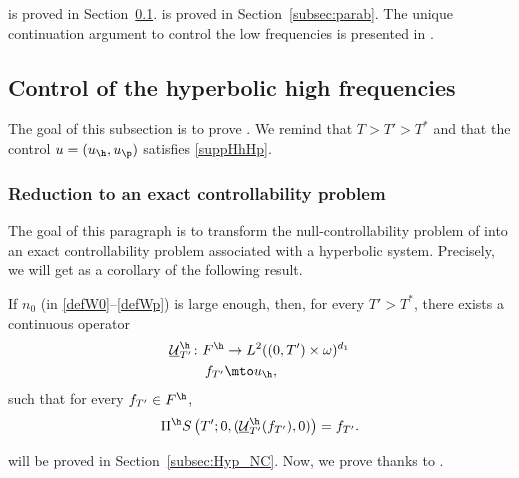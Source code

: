  is proved in Section~\ref{subsec:hyp}.
 is proved in Section~\ref{subsec:parab}.
The unique continuation argument to control the low frequencies is presented in .

\subsection{Control of the hyperbolic high frequencies} \label{subsec:hyp}
The goal of this subsection is to prove . We remind that $T > T' >T^\ast$ and that the control $u = (u_\h,u_\p)$ satisfies \eqref{suppHhHp}.

\subsubsection{Reduction to an exact controllability problem}
\label{SecReduceHyp}

The goal of this paragraph is to transform the null-controllability problem of  into an exact controllability problem associated with a hyperbolic system. Precisely, we will get  as a corollary of the following result.

\begin{prop} \label{LemHyp_BIS}
If $n_0$ (in \eqref{defW0}--\eqref{defWp}) is large enough, then, for every ${T'}>T^*$, there exists a continuous operator
\begin{align*}
\underline{\mathcal U}_{T'}^\h \colon
F^{\h} & \to L^2((0,T')\times\omega)^{d_1}\\
f_{T'} &\mto u_{\h},
\end{align*}
such that for every $f_{T'} \in F^{\h}$,
\begin{equation*}
\Pi^{\h} S \left({T'}; 0, (\underline{\mathcal U}_{T'}^\h(f_{T'}),0) \right) = f_{T'}.
\end{equation*}
\end{prop}

 will be proved in Section~\ref{subsec:Hyp_NC}. Now, we prove  thanks to .


